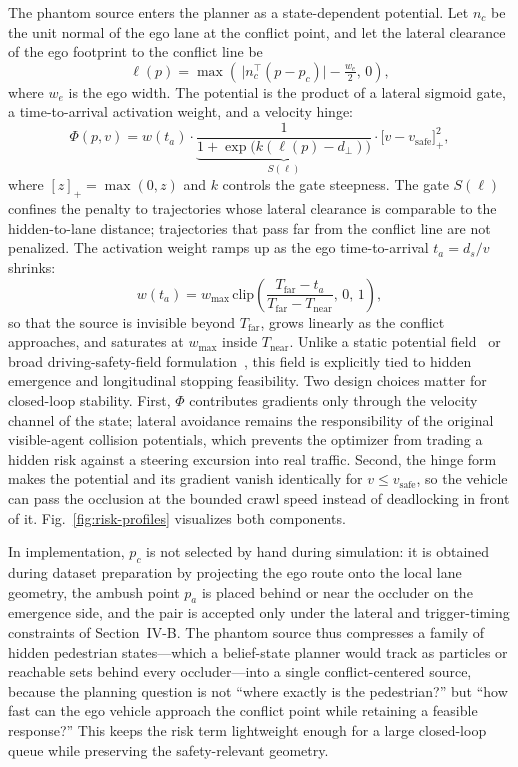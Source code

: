 \documentclass[journal]{IEEEtran}
\begin{document}
The phantom source enters the planner as a state-dependent potential. Let $n_c$ be the unit normal of the ego lane at the conflict point, and let the lateral clearance of the ego footprint to the conflict line be
\begin{equation}
  \ell(p) = \max\!\left(\,\bigl|n_c^{\top}(p - p_c)\bigr| - \tfrac{w_e}{2},\, 0\right),
\end{equation}
where $w_e$ is the ego width. The potential is the product of a lateral sigmoid gate, a time-to-arrival activation weight, and a velocity hinge:
\begin{equation}
  \Phi(p, v) =
  w(t_a)\cdot
  \underbrace{\frac{1}{1+\exp\!\bigl(k(\ell(p)-d_\perp)\bigr)}}_{S(\ell)}
  \cdot\bigl[v - v_{\mathrm{safe}}\bigr]_+^{2},
  \label{eq:phantom}
\end{equation}
where $[z]_+=\max(0,z)$ and $k$ controls the gate steepness. The gate $S(\ell)$ confines the penalty to trajectories whose lateral clearance is comparable to the hidden-to-lane distance; trajectories that pass far from the conflict line are not penalized. The activation weight ramps up as the ego time-to-arrival $t_a = d_s/v$ shrinks:
\begin{equation}
  w(t_a) = w_{\max}\,
  \mathrm{clip}\!\left(\frac{T_{\mathrm{far}} - t_a}{T_{\mathrm{far}} - T_{\mathrm{near}}},\,0,\,1\right),
  \label{eq:ttaweight}
\end{equation}
so that the source is invisible beyond $T_{\mathrm{far}}$, grows linearly as the conflict approaches, and saturates at $w_{\max}$ inside $T_{\mathrm{near}}$. Unlike a static potential field~\cite{khatib1986potential} or broad driving-safety-field formulation~\cite{wang2015drivingfield}, this field is explicitly tied to hidden emergence and longitudinal stopping feasibility. Two design choices matter for closed-loop stability. First, $\Phi$ contributes gradients only through the velocity channel of the state; lateral avoidance remains the responsibility of the original visible-agent collision potentials, which prevents the optimizer from trading a hidden risk against a steering excursion into real traffic. Second, the hinge form makes the potential and its gradient vanish identically for $v \le v_{\mathrm{safe}}$, so the vehicle can pass the occlusion at the bounded crawl speed instead of deadlocking in front of it. Fig.~\ref{fig:risk-profiles} visualizes both components.

In implementation, $p_c$ is not selected by hand during simulation: it is obtained during dataset preparation by projecting the ego route onto the local lane geometry, the ambush point $p_a$ is placed behind or near the occluder on the emergence side, and the pair is accepted only under the lateral and trigger-timing constraints of Section~IV-B. The phantom source thus compresses a family of hidden pedestrian states---which a belief-state planner would track as particles or reachable sets behind every occluder---into a single conflict-centered source, because the planning question is not ``where exactly is the pedestrian?'' but ``how fast can the ego vehicle approach the conflict point while retaining a feasible response?'' This keeps the risk term lightweight enough for a large closed-loop queue while preserving the safety-relevant geometry.
\end{document}
